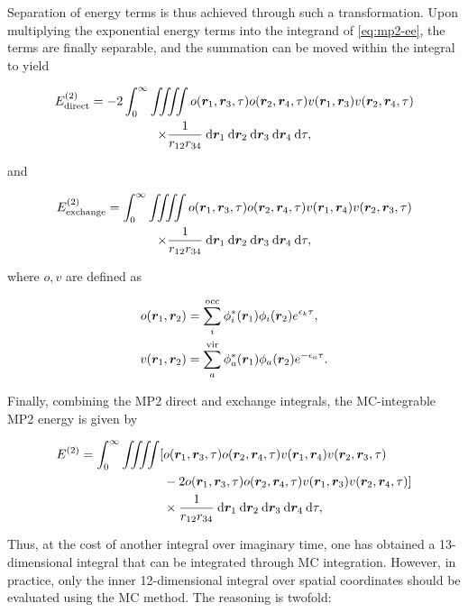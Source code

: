\noindent Separation of energy terms is thus achieved through such a
transformation. Upon multiplying the exponential energy terms into the integrand
of \ref{eq:mp2-ee}, the terms are finally separable, and the summation can be
moved within the integral to yield

\begin{multline}
\perturbE[\text{direct}]{2}
=
-2
\int_0^\infty
\iiiint
o(\bm r_1, \bm r_3, \tau) o(\bm r_2, \bm r_4, \tau) v(\bm r_1, \bm r_3) v(\bm r_2, \bm r_4, \tau)
\\
\times \frac{1}{r_{12}r_{34}}
\dif\bm r_1 \dif\bm r_2 \dif\bm r_3 \dif\bm r_4 \dif\tau,
\label{eq:mcmp2-dir}
\end{multline}

\noindent and

\begin{multline}
\perturbE[\text{exchange}]{2}
=
\int_0^\infty
\iiiint
o(\bm r_1, \bm r_3, \tau) o(\bm r_2, \bm r_4, \tau) v(\bm r_1, \bm r_4) v(\bm r_2, \bm r_3, \tau)
\\
\times \frac{1}{r_{12}r_{34}}
\dif\bm r_1 \dif\bm r_2 \dif\bm r_3 \dif\bm r_4 \dif\tau,
\label{eq:mcmp2-exch}
\end{multline}

\noindent where $o, v$ are defined as

\begin{align}
o(\bm r_1, \bm r_2)
&=
\sum_i^\text{occ}
\phi_i^*(\bm r_1) \phi_i(\bm r_2) e^{\epsilon_k \tau},
\\
v(\bm r_1, \bm r_2)
&=
\sum_a^\text{vir}
\phi_a^*(\bm r_1) \phi_a(\bm r_2) e^{- \epsilon_a \tau}.
\end{align}

Finally, combining the MP2 direct and exchange integrals, the MC-integrable MP2
energy is given by

\begin{equation}
\begin{split}
\perturbE[]{2}
=
\int_0^\infty
\iiiint
[
&o(\bm r_1, \bm r_3, \tau) o(\bm r_2, \bm r_4, \tau) v(\bm r_1, \bm r_4) v(\bm r_2, \bm r_3, \tau)
\\
& - 2 o(\bm r_1, \bm r_3, \tau) o(\bm r_2, \bm r_4, \tau) v(\bm r_1, \bm r_3) v(\bm r_2, \bm r_4, \tau)
]
\\
& \times \frac{1}{r_{12}r_{34}}
\dif\bm r_1 \dif\bm r_2 \dif\bm r_3 \dif\bm r_4 \dif\tau,
\label{eq:mcmp2}
\end{split}
\end{equation}

\noindent Thus, at the cost of another integral over imaginary time, one has obtained a
13-dimensional integral that can be integrated through MC integration.  However,
in practice, only the inner 12-dimensional integral over spatial coordinates
should be evaluated using the MC method. The reasoning is twofold:


